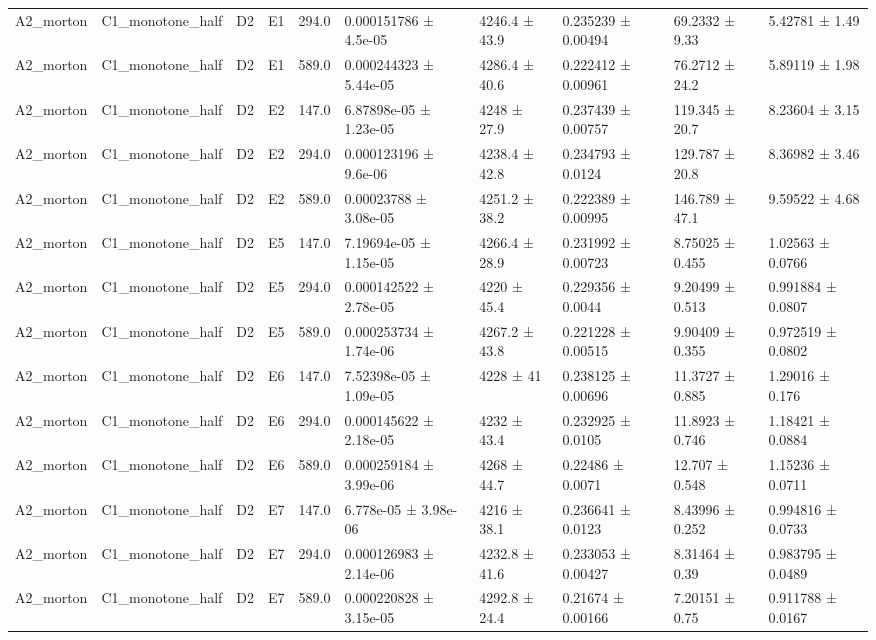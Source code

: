 \begin{table}
\begin{tabular}{llllllllll}
A2\_morton & C1\_monotone\_half & D2 & E1 & 294.0 & 0.000151786 ± 4.5e-05 & 4246.4 ± 43.9 & 0.235239 ± 0.00494 & 69.2332 ± 9.33 & 5.42781 ± 1.49 \\
A2\_morton & C1\_monotone\_half & D2 & E1 & 589.0 & 0.000244323 ± 5.44e-05 & 4286.4 ± 40.6 & 0.222412 ± 0.00961 & 76.2712 ± 24.2 & 5.89119 ± 1.98 \\
A2\_morton & C1\_monotone\_half & D2 & E2 & 147.0 & 6.87898e-05 ± 1.23e-05 & 4248 ± 27.9 & 0.237439 ± 0.00757 & 119.345 ± 20.7 & 8.23604 ± 3.15 \\
A2\_morton & C1\_monotone\_half & D2 & E2 & 294.0 & 0.000123196 ± 9.6e-06 & 4238.4 ± 42.8 & 0.234793 ± 0.0124 & 129.787 ± 20.8 & 8.36982 ± 3.46 \\
A2\_morton & C1\_monotone\_half & D2 & E2 & 589.0 & 0.00023788 ± 3.08e-05 & 4251.2 ± 38.2 & 0.222389 ± 0.00995 & 146.789 ± 47.1 & 9.59522 ± 4.68 \\
A2\_morton & C1\_monotone\_half & D2 & E5 & 147.0 & 7.19694e-05 ± 1.15e-05 & 4266.4 ± 28.9 & 0.231992 ± 0.00723 & 8.75025 ± 0.455 & 1.02563 ± 0.0766 \\
A2\_morton & C1\_monotone\_half & D2 & E5 & 294.0 & 0.000142522 ± 2.78e-05 & 4220 ± 45.4 & 0.229356 ± 0.0044 & 9.20499 ± 0.513 & 0.991884 ± 0.0807 \\
A2\_morton & C1\_monotone\_half & D2 & E5 & 589.0 & 0.000253734 ± 1.74e-06 & 4267.2 ± 43.8 & 0.221228 ± 0.00515 & 9.90409 ± 0.355 & 0.972519 ± 0.0802 \\
A2\_morton & C1\_monotone\_half & D2 & E6 & 147.0 & 7.52398e-05 ± 1.09e-05 & 4228 ± 41 & 0.238125 ± 0.00696 & 11.3727 ± 0.885 & 1.29016 ± 0.176 \\
A2\_morton & C1\_monotone\_half & D2 & E6 & 294.0 & 0.000145622 ± 2.18e-05 & 4232 ± 43.4 & 0.232925 ± 0.0105 & 11.8923 ± 0.746 & 1.18421 ± 0.0884 \\
A2\_morton & C1\_monotone\_half & D2 & E6 & 589.0 & 0.000259184 ± 3.99e-06 & 4268 ± 44.7 & 0.22486 ± 0.0071 & 12.707 ± 0.548 & 1.15236 ± 0.0711 \\
A2\_morton & C1\_monotone\_half & D2 & E7 & 147.0 & 6.778e-05 ± 3.98e-06 & 4216 ± 38.1 & 0.236641 ± 0.0123 & 8.43996 ± 0.252 & 0.994816 ± 0.0733 \\
A2\_morton & C1\_monotone\_half & D2 & E7 & 294.0 & 0.000126983 ± 2.14e-06 & 4232.8 ± 41.6 & 0.233053 ± 0.00427 & 8.31464 ± 0.39 & 0.983795 ± 0.0489 \\
A2\_morton & C1\_monotone\_half & D2 & E7 & 589.0 & 0.000220828 ± 3.15e-05 & 4292.8 ± 24.4 & 0.21674 ± 0.00166 & 7.20151 ± 0.75 & 0.911788 ± 0.0167 \\

\end{tabular}
\end{table}
